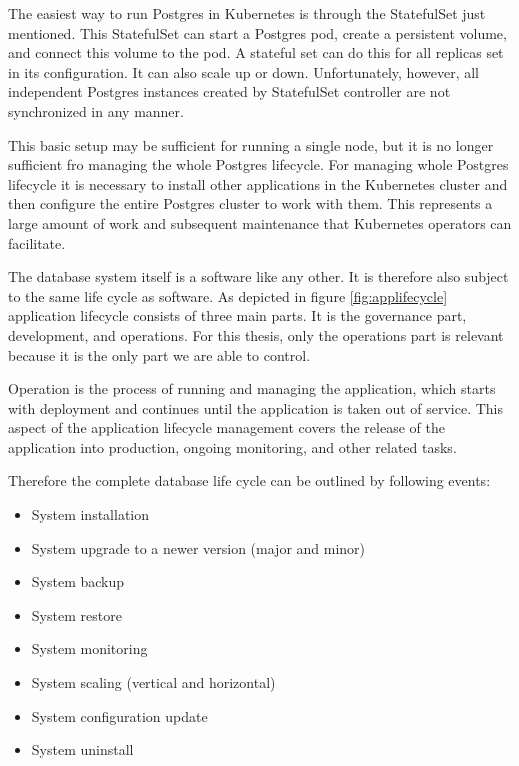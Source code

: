 The easiest way to run Postgres in Kubernetes is through the StatefulSet just mentioned. This StatefulSet can start a Postgres pod, create a persistent volume, and connect this volume to the pod. A stateful set can do this for all replicas set in its configuration. It can also scale up or down. Unfortunately, however, all independent Postgres instances created by StatefulSet controller are not synchronized in any manner.

This basic setup may be sufficient for running a single node, but it is no longer sufficient fro managing the whole Postgres lifecycle. For managing whole Postgres lifecycle it is necessary to install other applications in the Kubernetes cluster and then configure the entire Postgres cluster to work with them. This represents a large amount of work and subsequent maintenance that Kubernetes operators can facilitate.

\label{chap:lifecycle}
The database system itself is a software like any other. It is therefore also subject to the same life cycle as software.
As depicted in figure \ref{fig:applifecycle} application lifecycle consists of three main parts. It is the governance part, development, and operations. For this thesis, only the operations part is relevant because it is the only part we are able to control.

Operation is the process of running and managing the application, which starts with deployment and continues until the application is taken out of service. This aspect of the application lifecycle management covers the release of the application into production, ongoing monitoring, and other related tasks. \cite{ALM}

Therefore the complete database life cycle can be outlined by following events:
\begin{itemize}
    \item System installation
    \item System upgrade to a newer version (major and minor)
    \item System backup
    \item System restore
    \item System monitoring
    \item System scaling (vertical and horizontal)
    \item System configuration update
    \item System uninstall
\end{itemize}

